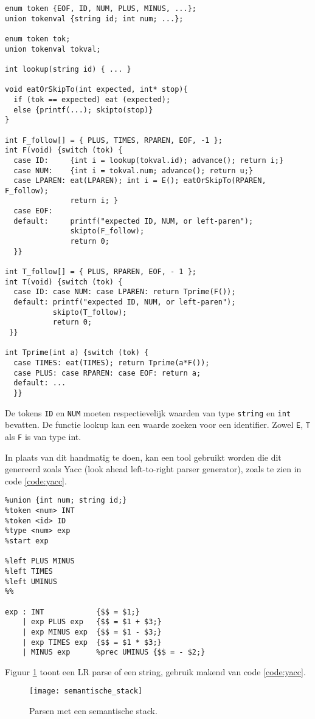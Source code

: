 \begin{lstlisting}[caption={Recursive-descent parser voor grammatica \ref{grammar_3_15}.},label={code:recursive_descent_parser_grammar315},captionpos=b]
enum token {EOF, ID, NUM, PLUS, MINUS, ...};
union tokenval {string id; int num; ...};

enum token tok;
union tokenval tokval;

int lookup(string id) { ... }

void eatOrSkipTo(int expected, int* stop){
  if (tok == expected) eat (expected);
  else {printf(...); skipto(stop)}
}

int F_follow[] = { PLUS, TIMES, RPAREN, EOF, -1 };
int F(void) {switch (tok) {
  case ID:     {int i = lookup(tokval.id); advance(); return i;}
  case NUM:    {int i = tokval.num; advance(); return u;}
  case LPAREN: eat(LPAREN); int i = E(); eatOrSkipTo(RPAREN, F_follow); 
               return i; }
  case EOF:
  default:     printf("expected ID, NUM, or left-paren");
               skipto(F_follow);
               return 0;
  }}

int T_follow[] = { PLUS, RPAREN, EOF, - 1 };
int T(void) {switch (tok) {
  case ID: case NUM: case LPAREN: return Tprime(F());
  default: printf("expected ID, NUM, or left-paren");
           skipto(T_follow);
           return 0;
 }}
 
int Tprime(int a) {switch (tok) {
  case TIMES: eat(TIMES); return Tprime(a*F());
  case PLUS: case RPAREN: case EOF: return a;
  default: ...
  }}
\end{lstlisting}

De tokens \texttt{ID} en \texttt{NUM} moeten respectievelijk waarden van type \texttt{string} en \texttt{int} bevatten. De functie lookup kan een waarde zoeken voor een identifier. Zowel \texttt{E}, \texttt{T} als \texttt{F} is van type int.

In plaats van dit handmatig te doen, kan een tool gebruikt worden die dit genereerd zoals Yacc (look ahead left-to-right parser generator), zoals te zien in code \ref{code:yacc}.
\begin{lstlisting}[caption={Yacc.},captionpos=b,label={code:yacc}]
%{ declarations of yylex  and yyerror %}
%union {int num; string id;}
%token <num> INT
%token <id> ID
%type <num> exp
%start exp

%left PLUS MINUS
%left TIMES
%left UMINUS
%%

exp : INT            {$$ = $1;}
    | exp PLUS exp   {$$ = $1 + $3;}
    | exp MINUS exp  {$$ = $1 - $3;}
    | exp TIMES exp  {$$ = $1 * $3;}
    | MINUS exp      %prec UMINUS {$$ = - $2;}
\end{lstlisting}
Figuur \ref{fig:semantische_stack} toont een LR parse of een string, gebruik makend van code \ref{code:yacc}.
\begin{figure}[h]
	\texttt{[image: semantische\_stack]}
	\caption{Parsen met een semantische stack.}
	\label{fig:semantische_stack}
\end{figure}

